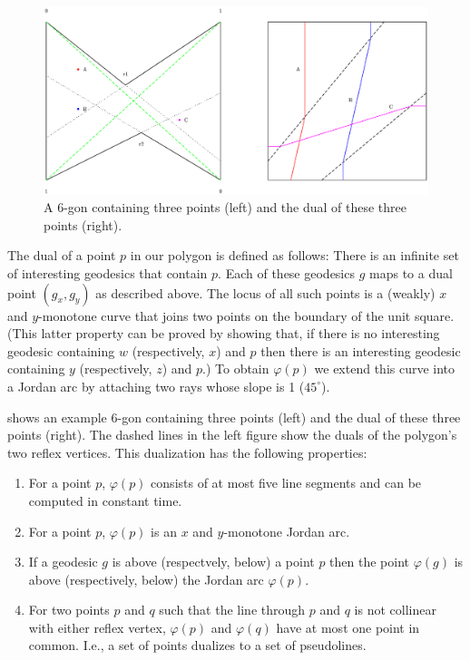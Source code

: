 \documentclass[charterfonts,lotsofwhite]{patmorin}
\newcommand{\dual}[1]{\varphi(#1)}
\begin{document}
\begin{figure}[htbp]
\begin{center}\includegraphics[scale=0.6]{dual}\end{center}
\caption{A 6-gon containing three points (left) and the dual of these
three points (right).}
\end{figure}

The dual of a point $p$ in our polygon is defined as follows:  There
is an infinite set of interesting geodesics that contain $p$.  Each of
these geodesics $g$ maps to a dual point $(g_x,g_y)$ as described
above.  The locus of all such points is a (weakly) $x$ and
$y$-monotone curve that joins two points on the boundary of the unit
square. (This latter property can be proved by showing that, if there
is no interesting geodesic containing $w$ (respectively, $x$) and $p$
then there is an interesting geodesic containing $y$ (respectively,
$z$) and $p$.) To obtain $\dual{p}$ we extend this curve into a Jordan
arc by attaching two rays whose slope is 1 ($45^\circ$).

 shows an example 6-gon containing three points
(left) and the dual of these three points (right).  The dashed lines
in the left figure show the duals of the polygon's two reflex
vertices.  This dualization has the following properties:
\begin{enumerate}
\item For a point $p$, $\dual{p}$ consists of at most five line
segments and can be computed in constant time.

\item For a point $p$, $\dual{p}$ is an $x$ and $y$-monotone Jordan
arc. 

\item If a geodesic $g$ is above (respectvely, below) a point $p$ then
the point $\dual{g}$ is above (respectively, below) the Jordan arc
$\dual{p}$.

\item For two points $p$ and $q$ such that the line through $p$ and
$q$ is not collinear with either reflex vertex, $\dual{p}$ and
$\dual{q}$ have at most one point in common.  I.e., a set of
points dualizes to a set of pseudolines.

\end{enumerate}
\end{document}
